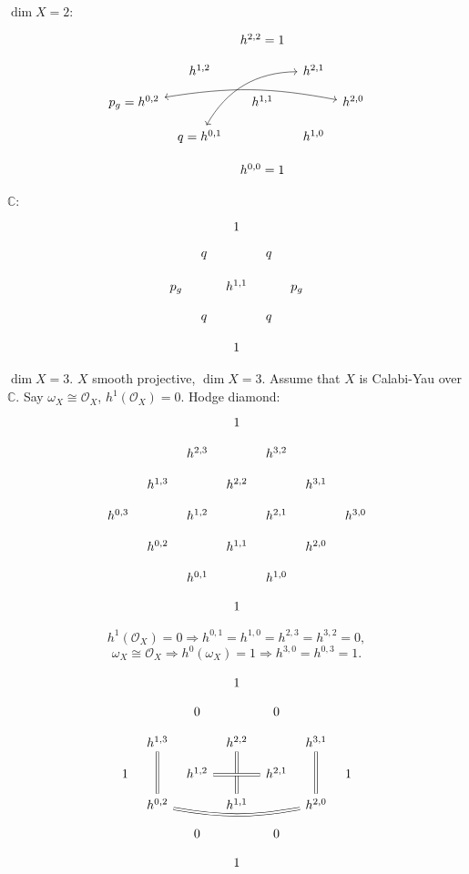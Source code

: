 \documentclass[12pt]{article}
\theoremstyle{definition}
\begin{document}
$\dim X=2$:
\[
\begin{tikzcd}[column sep = tiny,row sep = small]
&&h^{2,2}=1\\
&h^{1,2}&&h^{2,1}\\
p_g=h^{0,2}\arrow[<->,rrrr,bend left=10]&&h^{1,1}&&h^{2,0}\\
&q=h^{0,1}\arrow[<->,rruu,bend left]&&h^{1,0}\\
&&h^{0,0}=1
\end{tikzcd}
\]

$\mathbb{C}$:
\[
\begin{tikzcd}[column sep = tiny,row sep = small]
&&1\\
&q&&q\\
p_g&&h^{1,1}&&p_g\\
&q&&q\\
&&1
\end{tikzcd}
\]

$\dim X=3$. $X$ smooth projective, $\dim X=3$. Assume that $X$ is Calabi-Yau over $\mathbb{C}$. Say $\omega_X\cong\mathcal{O}_X$, $h^1(\mathcal{O}_X)=0$. Hodge diamond:
\[
\begin{tikzcd}[column sep = tiny,row sep = small]
&&&1\\
&&h^{2,3}&&h^{3,2}\\
&h^{1,3}&&h^{2,2}&&h^{3,1}\\
h^{0,3}&&h^{1,2}&&h^{2,1}&&h^{3,0}\\
&h^{0,2}&&h^{1,1}&&h^{2,0}\\
&&h^{0,1}&&h^{1,0}\\
&&&1
\end{tikzcd}
\]

\[h^1(\mathcal{O}_X)=0\Rightarrow h^{0,1}=h^{1,0}=h^{2,3}=h^{3,2}=0,\]
\[\omega_X\cong\mathcal{O}_X\Rightarrow h^0(\omega_X)=1\Rightarrow h^{3,0}=h^{0,3}=1.\]

\[
\begin{tikzcd}[column sep = tiny,row sep = small]
&&&1\\
&&0&&0\\
&h^{1,3}\arrow[dd,-,double equal sign distance,double]&&h^{2,2}\arrow[dd,-,double equal sign distance,double]&&h^{3,1}\arrow[dd,-,double equal sign distance,double]\\
1&&h^{1,2}\arrow[rr,-,double equal sign distance,double]&&h^{2,1}&&1\\
&h^{0,2}\arrow[rrrr,-,double equal sign distance,double,bend right=10]&&h^{1,1}&&h^{2,0}\\
&&0&&0\\
&&&1
\end{tikzcd}
\]
\end{document}
